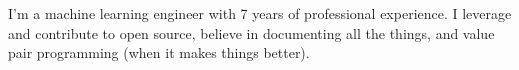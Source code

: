 \par{
I’m a machine learning engineer with 7 years of professional experience. I leverage and contribute to open source, believe in documenting all the things, and value pair programming (when it makes things better).
}
